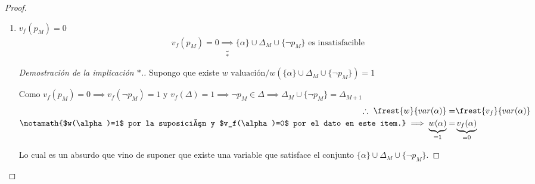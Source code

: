 \begin{itemize}[align=right]
\begin{enumerate}
\begin{proof}
\begin{enumerate}
                    \smallskip

                    Por otra parte, en este caso tenemos que
                    \begin{gather*}
                        \underbrace{\{ \alpha \} \cup \Delta_M 
                        \cup \{ p_M \}}_{\substack{\text{Finito e} \\
                        \text{insatisfacible}}}
                        \subseteq \underbrace{\Gamma \cup 
                        \Delta_{M+1}}_{\text{Es f.s.}}
                    \end{gather*}
                    Lo cual es un absurdo que vino de suponer que $v_f(p_M)=1$

                    \item $v_f(p_M)=0$
                    \begin{gather*}
                        v_f(p_M)=0 
                            \underbrace{\implies}_{*}
                            \{ \alpha \} \cup \Delta_M \cup \{ \neg p_M \} 
                            \text{ es insatisfacible}
                    \end{gather*}

                    \medskip

                    \begin{proof}[Demostración de la implicación $*$.]
                        \phantom{.}

                    Supongo que existe $w \text{ valuación} /
                    w ( \{ \alpha \} \cup \Delta_M \cup \{ \neg p_M \}) = 1$

                    Como $v_f(p_M)=0 
                    \implies v_f(\neg p_M)=1 \text{ y } v_f(\Delta)=1
                    \implies \neg p_M \in \Delta 
                    \implies \Delta_M \cup \{ \neg p_M \} = \Delta_{M+1}$
                    \begin{align*}
                        \therefore ~ 
                        \frest{w}{var(\alpha)} =& \frest{v_f}{var(\alpha)} \\
                        \notamath{$w(\alpha)=1$ por la suposición y
                        $v_f(\alpha)=0$ por el dato en este item.}
                        \implies \underbrace{w(\alpha)}_{=1} =& 
                        \underbrace{v_f(\alpha)}_{=0} \\
                    \end{align*}

                    Lo cual es un absurdo que vino de suponer que existe una
                    variable que satisface  el conjunto
                    $\{ \alpha \} \cup \Delta_M \cup \{ \neg p_M \}$. 


\end{proof}
\end{enumerate}
\end{proof}
\end{enumerate}
\end{itemize}

